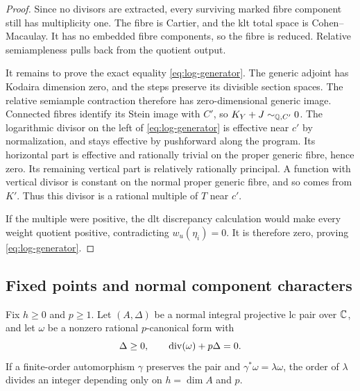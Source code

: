 \begin{proof}
Since no divisors are extracted, every surviving marked fibre
component still has multiplicity one. The fibre is Cartier, and the
klt total space is Cohen--Macaulay. It has no embedded fibre components,
so the fibre is reduced. Relative semiampleness pulls back from the
quotient output.

It remains to prove the exact equality \eqref{eq:log-generator}.
The generic adjoint has Kodaira dimension zero, and the steps preserve
its divisible section spaces. The relative semiample contraction
therefore has zero-dimensional generic image. Connected fibres
identify its Stein image with $C'$, so $K_Y+J\sim_{\mathbb Q,C'}0$.
The logarithmic divisor on the left of \eqref{eq:log-generator}
is effective near $c'$ by normalization, and stays effective by
pushforward along the program. Its horizontal part is effective
and rationally trivial on the proper generic fibre, hence zero.
Its remaining vertical part is relatively rationally principal.
A function with vertical divisor is constant on the normal proper
generic fibre, and so comes from $K'$. Thus this divisor is a
rational multiple of $T$ near $c'$.

If the multiple were positive, the dlt discrepancy calculation would
make every weight quotient positive, contradicting
$w_u(\eta_i)=0$. It is therefore zero, proving
\eqref{eq:log-generator}.
\end{proof}

\subsection{Fixed points and normal component characters}

\begin{lemma}
\label{lem:normal-character}
Fix $h\geq0$ and $p\geq1$. Let $(A,\Delta)$ be a normal integral
projective lc pair over $\mathbb C$, and let $\omega$ be a nonzero rational
$p$-canonical form with
\[
              \Delta\geq0,\qquad \operatorname{div}(\omega)+p\Delta=0.
\]
If a finite-order automorphism $\gamma$ preserves the pair and
$\gamma^*\omega=\lambda\omega$, the order of $\lambda$ divides
an integer depending only on $h=\dim A$ and $p$.
\end{lemma}


